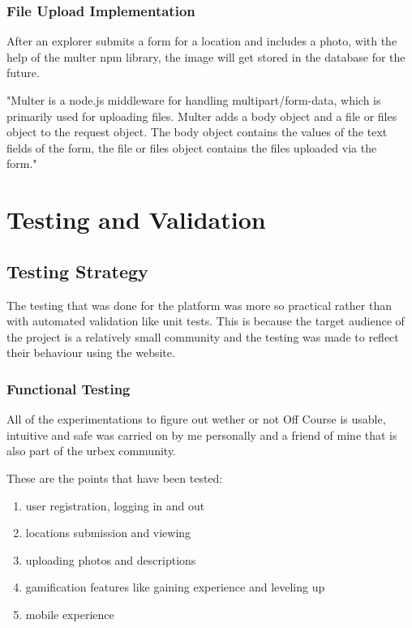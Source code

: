 \documentclass[12pt,a4paper]{report}
\begin{document}
\subsection{File Upload Implementation}

After an explorer submits a form for a location and includes a photo, with the help of the multer npm library, the image will get stored in the database for the future.

"Multer is a node.js middleware for handling multipart/form-data, which is primarily used for uploading files. Multer adds a body object and a file or files object to the request object. The body object contains the values of the text fields of the form, the file or files object contains the files uploaded via the form."~\cite{multer}


\chapter{Testing and Validation}
\section{Testing Strategy}

The testing that was done for the platform was more so practical rather than with automated validation like unit tests. This is because the target audience of the project is a relatively small community and the testing was made to reflect their behaviour using the website.

\subsection{Functional Testing}

All of the experimentations to figure out wether or not Off Course is usable, intuitive and safe was carried on by me personally and a friend of mine that is also part of the urbex community.

These are the points that have been tested:

\begin{enumerate}
    \item user registration, logging in and out
    \item locations submission and viewing
    \item uploading photos and descriptions
    \item gamification features like gaining experience and leveling up
    \item mobile experience
\end{enumerate}
\end{document}

